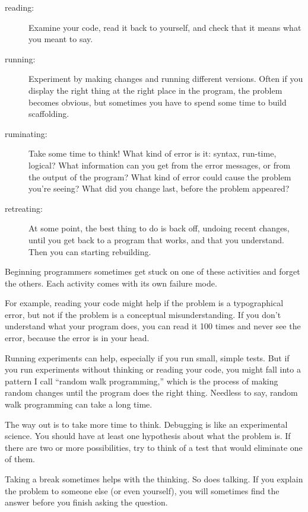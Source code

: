 \documentclass{book}
\begin{document}
\begin{description}

\item[reading:] Examine your code, read it back to yourself, and
check that it means what you meant to say.

\item[running:] Experiment by making changes and running different
versions. Often if you display the right thing at the right place
in the program, the problem becomes obvious, but sometimes you have to
spend some time to build scaffolding.

\item[ruminating:] Take some time to think! What kind of error
is it: syntax, run-time, logical? What information can you get from
the error messages, or from the output of the program? What kind of
error could cause the problem you're seeing? What did you change
last, before the problem appeared?

\item[retreating:] At some point, the best thing to do is back
off, undoing recent changes, until you get back to a program that
works, and that you understand. Then you can starting rebuilding.

\end{description}

Beginning programmers sometimes get stuck on one of these activities
and forget the others. Each activity comes with its own failure
mode.

For example, reading your code might help if the problem is a
typographical error, but not if the problem is a conceptual
misunderstanding. If you don't understand what your program does, you
can read it 100 times and never see the error, because the error is in
your head.

Running experiments can help, especially if you run small, simple
tests. But if you run experiments without thinking or reading your
code, you might fall into a pattern I call ``random walk programming,''
which is the process of making random changes until the program
does the right thing. Needless to say, random walk programming
can take a long time.

The way out is to take more time to think. Debugging is like an
experimental science. You should have at least one hypothesis about
what the problem is. If there are two or more possibilities, try to
think of a test that would eliminate one of them.

Taking a break sometimes helps with the thinking. So does talking.
If you explain the problem to someone else (or even yourself), you
will sometimes find the answer before you finish asking the question.
\end{document}
